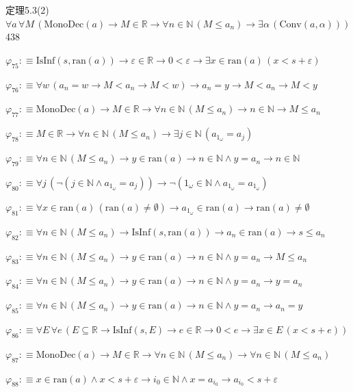 \begin{fullproof}{定理5.3(2)}{$\forall a\,\forall M\,(\mathrm{MonoDec}(a) \to M \in \mathbb{R} \to \forall n \in \mathbb{N}\,(M \leq a_{n}) \to \exists \alpha\,(\mathrm{Conv}(a,\alpha)))$}{438}
\begin{abbrevlist}
\item $\varphi_{75} :\equiv \mathrm{IsInf}(s,\mathrm{ran}(a)) \to \varepsilon \in \mathbb{R} \to 0 < \varepsilon \to \exists x \in \mathrm{ran}(a)\,(x < s + \varepsilon)$
\item $\varphi_{76} :\equiv \forall w\,(a_{n} = w \to M < a_{n} \to M < w) \to a_{n} = y \to M < a_{n} \to M < y$
\item $\varphi_{77} :\equiv \mathrm{MonoDec}(a) \to M \in \mathbb{R} \to \forall n \in \mathbb{N}\,(M \leq a_{n}) \to n \in \mathbb{N} \to M \leq a_{n}$
\item $\varphi_{78} :\equiv M \in \mathbb{R} \to \forall n \in \mathbb{N}\,(M \leq a_{n}) \to \exists j \in \mathbb{N}\,(a_{1_{\omega}} = a_{j})$
\item $\varphi_{79} :\equiv \forall n \in \mathbb{N}\,(M \leq a_{n}) \to y \in \mathrm{ran}(a) \to n \in \mathbb{N} \land y = a_{n} \to n \in \mathbb{N}$
\item $\varphi_{80} :\equiv \forall j\,(\neg (j \in \mathbb{N} \land a_{1_{\omega}} = a_{j})) \to \neg (1_{\omega} \in \mathbb{N} \land a_{1_{\omega}} = a_{1_{\omega}})$
\item $\varphi_{81} :\equiv \forall x \in \mathrm{ran}(a)\,(\mathrm{ran}(a) \neq \emptyset) \to a_{1_{\omega}} \in \mathrm{ran}(a) \to \mathrm{ran}(a) \neq \emptyset$
\item $\varphi_{82} :\equiv \forall n \in \mathbb{N}\,(M \leq a_{n}) \to \mathrm{IsInf}(s,\mathrm{ran}(a)) \to a_{n} \in \mathrm{ran}(a) \to s \leq a_{n}$
\item $\varphi_{83} :\equiv \forall n \in \mathbb{N}\,(M \leq a_{n}) \to y \in \mathrm{ran}(a) \to n \in \mathbb{N} \land y = a_{n} \to M \leq a_{n}$
\item $\varphi_{84} :\equiv \forall n \in \mathbb{N}\,(M \leq a_{n}) \to y \in \mathrm{ran}(a) \to n \in \mathbb{N} \land y = a_{n} \to y = a_{n}$
\item $\varphi_{85} :\equiv \forall n \in \mathbb{N}\,(M \leq a_{n}) \to y \in \mathrm{ran}(a) \to n \in \mathbb{N} \land y = a_{n} \to a_{n} = y$
\item $\varphi_{86} :\equiv \forall E\,\forall e\,(E \subseteq \mathbb{R} \to \mathrm{IsInf}(s,E) \to e \in \mathbb{R} \to 0 < e \to \exists x \in E\,(x < s + e))$
\item $\varphi_{87} :\equiv \mathrm{MonoDec}(a) \to M \in \mathbb{R} \to \forall n \in \mathbb{N}\,(M \leq a_{n}) \to \forall n \in \mathbb{N}\,(M \leq a_{n})$
\item $\varphi_{88} :\equiv x \in \mathrm{ran}(a) \land x < s + \varepsilon \to i_{0} \in \mathbb{N} \land x = a_{i_{0}} \to a_{i_{0}} < s + \varepsilon$

\end{abbrevlist}
\end{fullproof}
